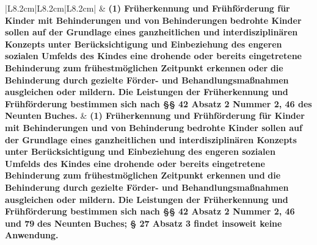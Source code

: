 \documentclass[10pt,a4paper,landscape]{article}
\begin{document}
\begin{longtable}{|L{8.2cm}|L{8.2cm}|L{8.2cm}|}
 & \textbf{(1) Früherkennung und Frühförderung  \newline für Kinder mit Behinderungen und von} \newline \textbf{\textcolor{diffred}{Behinderungen}}\textbf{ bedrohte Kinder sollen  \newline auf der Grundlage eines ganzheitlichen  \newline und interdisziplinären Konzepts unter  \newline Berücksichtigung und Einbeziehung des  \newline engeren sozialen Umfelds des Kindes  \newline eine drohende oder bereits eingetretene  \newline Behinderung zum frühestmöglichen  \newline Zeitpunkt erkennen }\textbf{\textcolor{diffred}{oder}}\textbf{ die  \newline Behinderung durch gezielte Förder- und  \newline Behandlungsmaßnahmen ausgleichen  \newline oder mildern. Die Leistungen der  \newline Früherkennung und Frühförderung  \newline bestimmen sich nach \S{}\S{} 42 Absatz 2  \newline Nummer 2, 46 des Neunten }\textbf{\textcolor{diffred}{Buches.}} & \textbf{(1) Früherkennung und Frühförderung  \newline für Kinder mit Behinderungen und von} \newline \textbf{\textcolor{diffgreen}{Behinderung}}\textbf{ bedrohte Kinder sollen auf  \newline der Grundlage eines ganzheitlichen und  \newline interdisziplinären Konzepts unter  \newline Berücksichtigung und Einbeziehung des  \newline engeren sozialen Umfelds des Kindes  \newline eine drohende oder bereits eingetretene  \newline Behinderung zum frühestmöglichen  \newline Zeitpunkt erkennen }\textbf{\textcolor{diffgreen}{und}}\textbf{ die  \newline Behinderung durch gezielte Förder- und  \newline Behandlungsmaßnahmen ausgleichen  \newline oder mildern. Die Leistungen der  \newline Früherkennung und Frühförderung  \newline bestimmen sich nach \S{}\S{} 42 Absatz 2  \newline Nummer 2, 46 }\textbf{\textcolor{diffgreen}{und 79}}\textbf{ des Neunten} \newline \textbf{\textcolor{diffgreen}{Buches; \S{} 27 Absatz 3 findet insoweit  \newline keine Anwendung.}} \\

\end{longtable}
\end{document}
